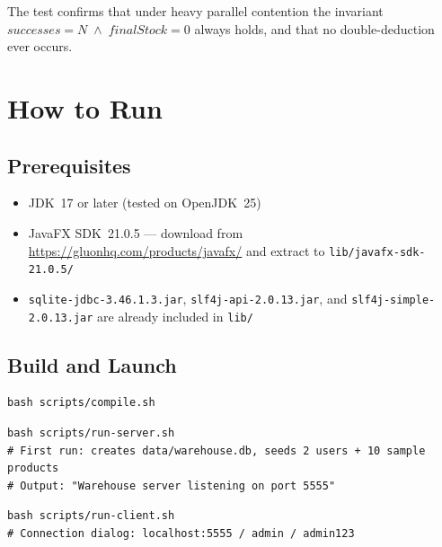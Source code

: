 \documentclass[12pt,a4paper]{article}
\begin{document}
The test confirms that under heavy parallel contention the invariant
$\textit{successes} = N \;\wedge\; \textit{finalStock} = 0$
always holds, and that no double-deduction ever occurs.

\section{How to Run}

\subsection{Prerequisites}

\begin{itemize}[leftmargin=1.4em]
  \item JDK~17 or later (tested on OpenJDK~25)
  \item JavaFX SDK~21.0.5 --- download from
        \url{https://gluonhq.com/products/javafx/} and extract to
        \texttt{lib/javafx-sdk-21.0.5/}
  \item \texttt{sqlite-jdbc-3.46.1.3.jar}, \texttt{slf4j-api-2.0.13.jar},
        and \texttt{slf4j-simple-2.0.13.jar} are already included in
        \texttt{lib/}
\end{itemize}

\subsection{Build and Launch}

\begin{lstlisting}[style=shell, numbers=none, caption={Step 1 --- Compile}]
bash scripts/compile.sh
\end{lstlisting}

\begin{lstlisting}[style=shell, numbers=none, caption={Step 2 --- Start the server (Terminal 1)}]
bash scripts/run-server.sh
# First run: creates data/warehouse.db, seeds 2 users + 10 sample products
# Output: "Warehouse server listening on port 5555"
\end{lstlisting}

\begin{lstlisting}[style=shell, numbers=none, caption={Step 3 --- Start the client (Terminal 2, repeat for multi-user demo)}]
bash scripts/run-client.sh
# Connection dialog: localhost:5555 / admin / admin123
\end{lstlisting}
\end{document}
